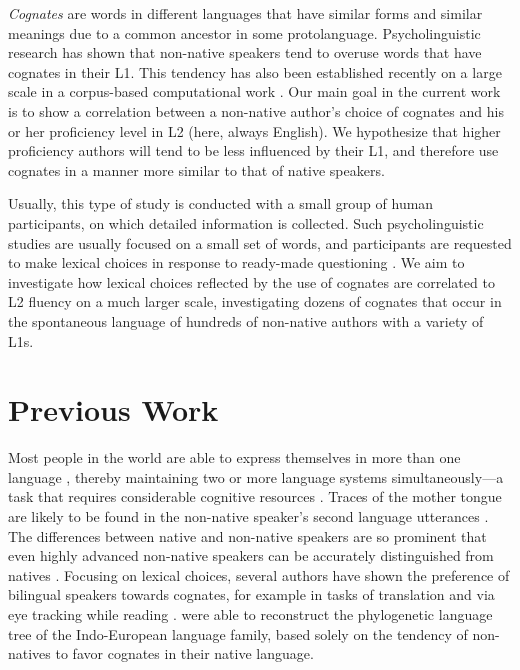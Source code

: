 \documentclass[11pt]{article}
\begin{document}
\emph{Cognates} are words in different languages that have  similar forms and similar meanings due to a common ancestor in some protolanguage. Psycholinguistic research has shown that non-native speakers tend to overuse words that have cognates in their L1.  This tendency has also been established recently on a large scale in a corpus-based computational work \citep{TACL1403}.
Our main goal in the current work is  to show a correlation between a non-native author's choice of cognates and his or her proficiency level in L2 (here, always English). 
We hypothesize that higher proficiency authors will tend to be less influenced by their L1, and therefore use cognates in a manner more similar to that of native speakers.

Usually, this type of study is conducted with a small group of human participants, on which detailed information is collected.  Such psycholinguistic studies are usually focused on a small set of words, and participants are requested to make lexical choices in response to ready-made questioning \citep{prior:2006a,BIL:8852637}.
We aim to investigate how lexical choices reflected by the use of cognates are correlated to L2 fluency on a much larger scale, investigating dozens of cognates that occur in the spontaneous language of hundreds of non-native authors with a variety of L1s.

\section{Previous Work}

Most people in the world are able to express themselves in more than one language \citep{grosjean2012psycholinguistics}, thereby maintaining two or more language systems simultaneously---a task that requires considerable cognitive resources  \citep{schlesinger:2003,hvelplund2014eye,Prior2014,Kroll_Bobb_Hoshino_2014}.
Traces of the mother tongue are likely to be found in the non-native speaker's second language utterances \citep{jarvis2008crosslinguistic}. The differences between native and non-native speakers are so prominent that even highly advanced non-native speakers can be accurately distinguished from natives \citep{tomokiyo2001you,bergsma2012stylometric,DBLP:conf/acl/RabinovichNOW16,D18-1395}. 
Focusing on lexical choices, several authors have shown the preference of bilingual speakers towards cognates, for example in tasks of translation and via eye tracking while reading  \citep{de1992determinants, prior2011translation, libben2009bilingual,cop2017reading}. 
\citet{TACL1403} were able to reconstruct the phylogenetic language tree of the Indo-European language family, based solely on the tendency of non-natives to favor cognates in their native language.
\end{document}
